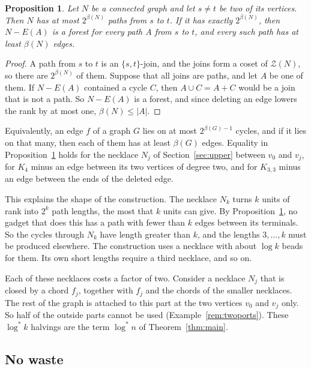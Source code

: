 \documentclass[11pt]{article}
\newtheorem{proposition}[theorem]{Proposition}
\theoremstyle{definition}
\theoremstyle{remark}
\newcommand{\Z}{\mathcal{Z}}
\newcommand{\lgs}{\log^{*}}
\begin{document}
\begin{proposition}\label{prop:terminal}
Let $N$ be a connected graph and let $s\ne t$ be two of its vertices. Then $N$ has at most
$2^{\beta(N)}$ paths from $s$ to $t$. If it has exactly $2^{\beta(N)}$, then $N-E(A)$ is a forest
for every path $A$ from $s$ to $t$, and every such path has at least $\beta(N)$ edges.
\end{proposition}

\begin{proof}
A path from $s$ to $t$ is an $\{s,t\}$-join, and the joins form a coset of $\Z(N)$, so there are
$2^{\beta(N)}$ of them. Suppose that all joins are paths, and let $A$ be one of them. If $N-E(A)$
contained a cycle $C$, then $A\cup C=A+C$ would be a join that is not a path. So $N-E(A)$ is a
forest, and since deleting an edge lowers the rank by at most one, $\beta(N)\le|A|$.
\end{proof}

Equivalently, an edge $f$ of a graph $G$ lies on at most $2^{\beta(G)-1}$ cycles, and if it lies on
that many, then each of them has at least $\beta(G)$ edges. Equality in
Proposition~\ref{prop:terminal} holds for the necklace $N_j$ of Section~\ref{sec:upper} between
$v_0$ and $v_j$, for $K_4$ minus an edge between its two vertices of degree two, and for $K_{3,3}$
minus an edge between the ends of the deleted edge.

This explains the shape of the construction. The necklace $N_k$ turns $k$ units of rank into
$2^{k}$ path lengths, the most that $k$ units can give. By Proposition~\ref{prop:terminal}, no
gadget that does this has a path with fewer than $k$ edges between its terminals. So the cycles
through $N_k$ have length greater than $k$, and the lengths $3,\dots,k$ must be produced elsewhere.
The construction uses a necklace with about $\log k$ beads for them. Its own short lengths require
a third necklace, and so on.

Each of these necklaces costs a factor of two. Consider a necklace $N_j$ that is closed by a chord
$f_j$, together with $f_j$ and the chords of the smaller necklaces. The rest of the graph is
attached to this part at the two vertices $v_0$ and $v_j$ only. So half of the outside parts cannot
be used (Example~\ref{rem:twoports}). These $\lgs k$ halvings are the term $\lgs n$ of
Theorem~\ref{thm:main}.

\subsection{No waste}
\end{document}
